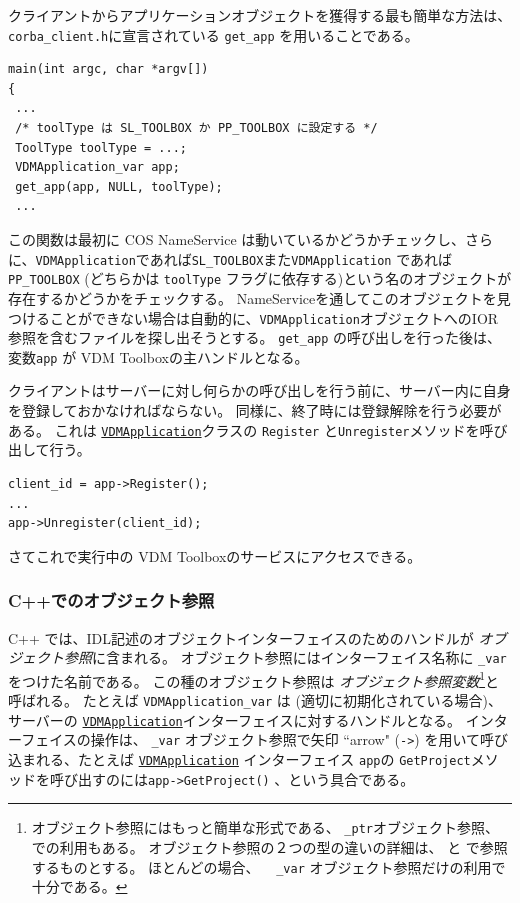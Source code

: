 \documentclass[\pformat,12pt]{jarticle}
\newcommand{\VDMApplication}{\hyperlink{interface.VDMApplication}{VDMApplication}}
\begin{document}
クライアントからアプリケーションオブジェクトを獲得する最も簡単な方法は、{\tt corba\_client.h}に宣言されている {\tt get\_app} を用いることである。

\begin{verbatim}
main(int argc, char *argv[])
{
 ...
 /* toolType は SL_TOOLBOX か PP_TOOLBOX に設定する */
 ToolType toolType = ...;
 VDMApplication_var app;
 get_app(app, NULL, toolType);
 ...
\end{verbatim}

この関数は最初に COS NameService は動いているかどうかチェックし、さらに、{\tt VDMApplication}であれば{\tt SL\_TOOLBOX}また{\tt VDMApplication} であれば{\tt PP\_TOOLBOX} (どちらかは {\tt toolType} フラグに依存する)という名のオブジェクトが存在するかどうかをチェックする。
 NameServiceを通してこのオブジェクトを見つけることができない場合は自動的に、{\tt VDMApplication}オブジェクトへのIOR参照を含むファイルを探し出そうとする。
 {\tt get\_app} の呼び出しを行った後は、変数{\tt app} が VDM Toolboxの主ハンドルとなる。

クライアントはサーバーに対し何らかの呼び出しを行う前に、サーバー内に自身を登録しておかなければならない。
同様に、終了時には登録解除を行う必要がある。
これは {\tt \VDMApplication}クラスの {\tt Register} と{\tt Unregister}メソッドを呼び出して行う。

\begin{verbatim}
client_id = app->Register();
...
app->Unregister(client_id);
\end{verbatim}

さてこれで実行中の VDM Toolboxのサービスにアクセスできる。


\subsubsection{C++でのオブジェクト参照}
\label{objectreferences}

C++ では、IDL記述のオブジェクトインターフェイスのためのハンドルが {\em オブジェクト参照}に含まれる。
オブジェクト参照にはインターフェイス名称に {\tt \_var} をつけた名前である。
この種のオブジェクト参照は {\em オブジェクト参照変数}\footnote{オブジェクト参照にはもっと簡単な形式である、 {\tt \_ptr}オブジェクト参照、での利用もある。
オブジェクト参照の２つの型の違いの詳細は、 \cite{omniORB3} と \cite{OMG&96} で参照するものとする。
ほとんどの場合、 {\tt　\_var} オブジェクト参照だけの利用で十分である。}と呼ばれる。
たとえば {\tt VDMApplication\_var} は (適切に初期化されている場合)、 サーバーの {\tt \VDMApplication}インターフェイスに対するハンドルとなる。
インターフェイスの操作は、 {\tt \_var} オブジェクト参照で矢印 ``arrow" ({\tt ->}) を用いて呼び込まれる、たとえば {\tt \VDMApplication} インターフェイス {\tt app}の {\tt GetProject}メソッドを呼び出すのには{\tt app->GetProject()} 、という具合である。
\end{document}
